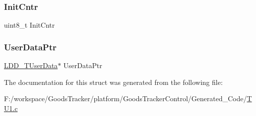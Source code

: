 \subsubsection{\texorpdfstring{Init\+Cntr}{InitCntr}}
{\footnotesize\ttfamily uint8\+\_\+t Init\+Cntr}

\mbox{\label{struct_t_u1___t_device_data_a8e77b9d030b00c231823350a904e0f83}} 
\subsubsection{\texorpdfstring{User\+Data\+Ptr}{UserDataPtr}}
{\footnotesize\ttfamily \hyperlink{group___p_e___types__module_ga0b66a73f87238a782318aa0be7578e35}{L\+D\+D\+\_\+\+T\+User\+Data}$\ast$ User\+Data\+Ptr}



The documentation for this struct was generated from the following file\+:\begin{DoxyCompactItemize}
\item 
F\+:/workspace/\+Goods\+Tracker/platform/\+Goods\+Tracker\+Control/\+Generated\+\_\+\+Code/\hyperlink{_t_u1_8c}{T\+U1.\+c}\end{DoxyCompactItemize}
